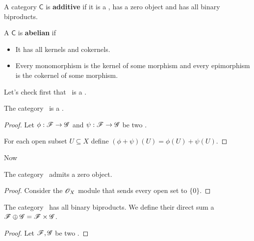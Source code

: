 \documentclass[../main.tex]{subfiles}
\begin{document}
\begin{definition} \label{def:additive-category}
  A category \(\mathsf{C}\) is \textbf{additive} if it is a , has a zero object and has all binary biproducts.
\end{definition}

\begin{definition} \label{def:abelian-category}
  A  \(\mathsf{C}\) is \textbf{abelian} if
  \begin{itemize}
    \item It has all kernels and cokernels.
    \item Every monomorphism is the kernel of some morphism and every epimorphism is the cokernel of some morphism.
  \end{itemize}
\end{definition}

Let's check first that \oxmod\ is a .
\begin{lemma}
  The category \oxmod\ is a .
\end{lemma}
\begin{proof}
  Let \(\phi: \mathscr{F} \to \mathscr{G}\) and \(\psi: \mathscr{F} \to \mathscr{G}\) be two .

  For each open subset \(U \subseteq X\) define \((\phi + \psi)(U) = \phi(U) + \psi(U)\).
\end{proof}

Now 
\begin{lemma}
  The category \oxmod\ admits a zero object.
\end{lemma}
\begin{proof}
  Consider the \(\mathscr{O}_{X}\) module that sends every open set to \(\{0\}\).
\end{proof}

\begin{lemma}
  The category \oxmod\ has all binary biproducts.
  We define their direct sum a \(\mathscr{F} \oplus \mathscr{G} = \mathscr{F} \times \mathscr{G}\).
\end{lemma}
\begin{proof}
  Let \(\mathscr{F}, \mathscr{G}\) be two .
\end{proof}
\end{document}
